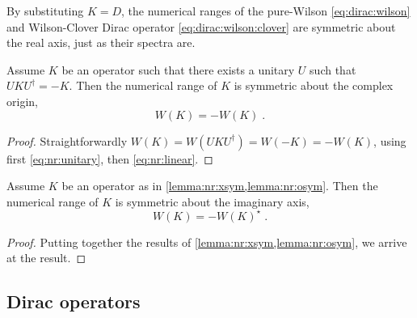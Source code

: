 By substituting $K=D$, the numerical ranges of the pure-Wilson \cref{eq:dirac:wilson} and Wilson-Clover Dirac operator \cref{eq:dirac:wilson:clover} are symmetric about the real axis, just as their spectra are.

\begin{lemma} \label{lemma:nr:osym}
Assume $K$ be an operator such that there exists a unitary $U$ such that $U K U^{\dagger} = -K$.
Then the numerical range of $K$ is symmetric about the complex origin,
\begin{equation}
W(K) = - W(K) \;.
\end{equation}
\end{lemma}

\begin{proof}
Straightforwardly $W(K) = W(U K U^{\dagger}) = W(-K) = -W(K)$, using first \cref{eq:nr:unitary}, then \cref{eq:nr:linear}.
\end{proof}

\begin{corollary} \label{lemma:nr:ysym}
Assume $K$ be an operator as in \cref{lemma:nr:xsym,lemma:nr:osym}.
Then the numerical range of $K$ is symmetric about the imaginary axis,
\begin{equation}
W(K) = - W(K)^{\star} \;.
\end{equation}
\end{corollary}

\begin{proof}
Putting together the results of \cref{lemma:nr:xsym,lemma:nr:osym}, we arrive at the result.
\end{proof}

\subsection{Dirac operators}

